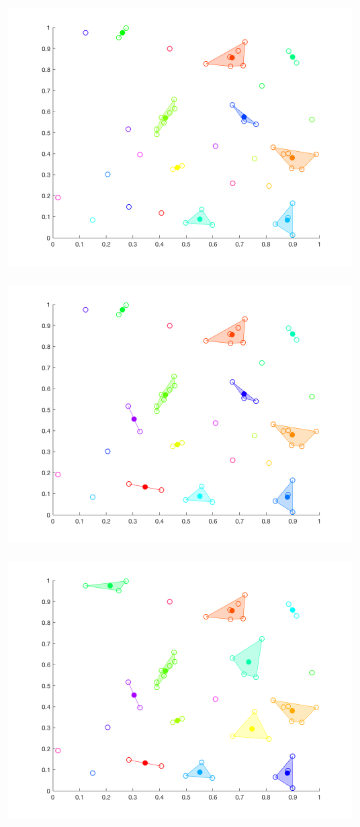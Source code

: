 \documentclass[12pt]{article}
\begin{document}
\begin{figure}[t!]
\begin{subfigure}[b]{0.3\textwidth}
        \includegraphics[width=\textwidth]{ha_3}
    \end{subfigure}
    \begin{subfigure}[b]{0.3\textwidth}
        \includegraphics[width=\textwidth]{ha_4}
    \end{subfigure}
    \begin{subfigure}[b]{0.3\textwidth}
        \includegraphics[width=\textwidth]{ha_5}

\end{subfigure}
\end{figure}
\end{document}
